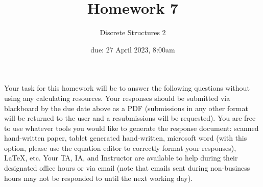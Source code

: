 \documentclass[11pt, oneside]{article}   	%
\title{Homework 7}
\author{Discrete Structures 2}
\date{due: 27 April 2023, 8:00am}							%
\begin{document}
\maketitle

Your task for this homework will be to answer the following questions without using any calculating resources. 
Your responses should be submitted via blackboard by the due date above as a PDF (submissions in any other format will be returned to the user and a resubmissions will be requested). 
You are free to use whatever tools you would like to generate the response document: 
scanned hand-written paper, 
tablet generated hand-written, 
microsoft word (with this option, please use the equation editor to correctly format your responses), 
\LaTeX, etc.
Your TA, IA, and Instructor are available to help during their designated office hours or via email 
(note that emails sent during non-business hours may not be responded to until the next working day). 
\end{document}
